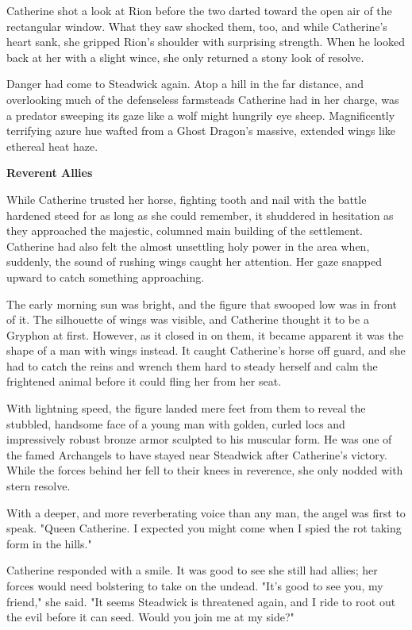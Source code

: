 \begin{multicols*}{2}
Catherine shot a look at Rion before the two darted toward the open air of the rectangular window. What they saw shocked them, too, and while Catherine's heart sank, she gripped Rion's shoulder with surprising strength. When he looked back at her with a slight wince, she only returned a stony look of resolve.

Danger had come to Steadwick again. Atop a hill in the far distance, and overlooking much of the defenseless farmsteads Catherine had in her charge, was a predator sweeping its gaze like a wolf might hungrily eye sheep. Magnificently terrifying azure hue wafted from a Ghost Dragon's massive, extended wings like ethereal heat haze.


\textbf{Reverent Allies}

While Catherine trusted her horse, fighting tooth and nail with the battle hardened steed for as long as she could remember, it shuddered in hesitation as they approached the majestic, columned main building of the settlement. Catherine had also felt the almost unsettling holy power in the area when, suddenly, the sound of rushing wings caught her attention. Her gaze snapped upward to catch something approaching. 

The early morning sun was bright, and the figure that swooped low was in front of it. The silhouette of wings was visible, and Catherine thought it to be a Gryphon at first. However, as it closed in on them, it became apparent it was the shape of a man with wings instead. It caught Catherine's horse off guard, and she had to catch the reins and wrench them hard to steady herself and calm the frightened animal before it could fling her from her seat.

With lightning speed, the figure landed mere feet from them to reveal the stubbled, handsome face of a young man with golden, curled locs and impressively robust bronze armor sculpted to his muscular form. He was one of the famed Archangels to have stayed near Steadwick after Catherine's victory. While the forces behind her fell to their knees in reverence, she only nodded with stern resolve.

With a deeper, and more reverberating voice than any man, the angel was first to speak. "Queen Catherine. I expected you might come when I spied the rot taking form in the hills."

Catherine responded with a smile. It was good to see she still had allies; her forces would need bolstering to take on the undead. "It's good to see you, my friend," she said. "It seems Steadwick is threatened again, and I ride to root out the evil before it can seed. Would you join me at my side?"


\end{multicols*}
